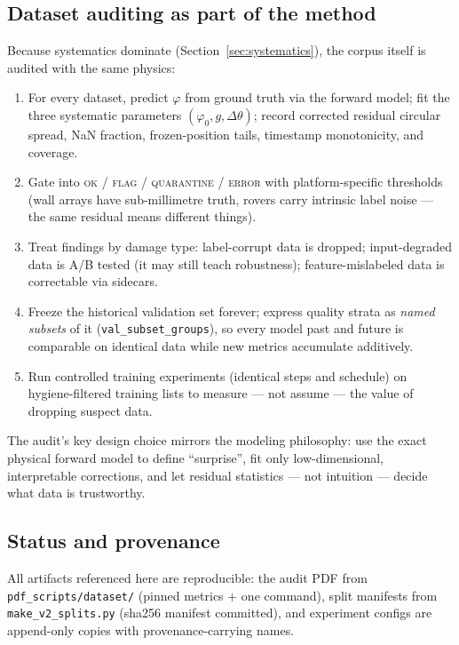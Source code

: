 \subsection{Dataset auditing as part of the method}
\label{sec:audit-approach}

Because systematics dominate (Section~\ref{sec:systematics}), the corpus
itself is audited with the same physics:

\begin{enumerate}
  \item For every dataset, predict $\varphi$ from ground truth via the
        forward model; fit the three systematic parameters
        $(\varphi_0, g, \Delta\theta)$; record corrected residual circular spread,
        NaN fraction, frozen-position tails, timestamp monotonicity, and
        coverage.
  \item Gate into \textsc{ok} / \textsc{flag} / \textsc{quarantine} /
        \textsc{error} with platform-specific thresholds (wall arrays have
        sub-millimetre truth, rovers carry intrinsic label noise --- the same
        residual means different things).
  \item Treat findings by damage type: label-corrupt data is dropped;
        input-degraded data is A/B tested (it may still teach robustness);
        feature-mislabeled data is correctable via sidecars.
  \item Freeze the historical validation set forever; express quality strata
        as \emph{named subsets} of it (\texttt{val\_subset\_groups}), so every
        model past and future is comparable on identical data while new
        metrics accumulate additively.
  \item Run controlled training experiments (identical steps and schedule)
        on hygiene-filtered training lists to measure --- not assume --- the
        value of dropping suspect data.
\end{enumerate}

The audit's key design choice mirrors the modeling philosophy: use the exact
physical forward model to define ``surprise'', fit only low-dimensional,
interpretable corrections, and let residual statistics --- not intuition ---
decide what data is trustworthy.

\subsection{Status and provenance}

All artifacts referenced here are reproducible: the audit PDF from
\texttt{pdf\_scripts/dataset/} (pinned metrics + one command), split
manifests from \texttt{make\_v2\_splits.py} (sha256 manifest committed), and
experiment configs are append-only copies with provenance-carrying names.
